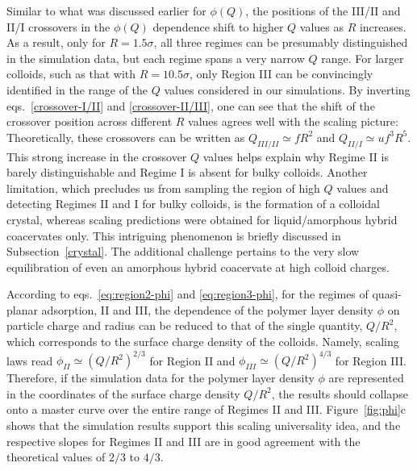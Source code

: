\documentclass[journal=mamobx, manuscript=article]{achemso}
\begin{document}
Similar to what was discussed earlier for $\phi (Q)$, the positions of the III/II and II/I crossovers in the $\phi (Q)$ dependence shift to higher $Q$ values as $R$ increases. As a result, only for $R = 1.5 \sigma$, all three regimes can be presumably distinguished in the simulation data, but each regime spans a very narrow $Q$ range. For larger colloids, such as that with $R = 10.5\sigma$, only Region III can be convincingly identified in the range of the $Q$ values considered in our simulations. By inverting eqs.~\ref{crossover-I/II} and \ref{crossover-II/III}, one can see that the shift of the crossover position across different $R$ values agrees well with the scaling picture: Theoretically, these crossovers can be written as $Q_{III/II} \simeq f R^2$ and 
$Q_{II/I} \simeq u f^3 R^5$. This strong increase in the crossover $Q$ values helps explain why Regime II is barely distinguishable and Regime I is absent for bulky colloids. Another limitation, which precludes us from sampling the region of high $Q$ values and detecting Regimes II and I for bulky colloids, is the formation of a colloidal crystal, whereas scaling predictions were obtained for liquid/amorphous hybrid coacervates only. This intriguing phenomenon is briefly discussed in Subsection~\ref{crystal}. The additional challenge pertains to the very slow equilibration of even an amorphous hybrid coacervate at high colloid charges. 


According to eqs.~\ref{eq:region2-phi} and \ref{eq:region3-phi}, for the regimes of quasi-planar adsorption, II and III, the dependence of the polymer layer density $\phi$ on particle charge and radius can be reduced to that of the single quantity, $Q / R^2$, which corresponds to the surface charge density of the colloids. Namely, scaling laws read 
$\phi_{II} \simeq (Q / R^2 )^{2/3}$ for Region II and $\phi_{III} \simeq (Q / R^2 )^{4/3}$ for Region III. Therefore, if the simulation data for the polymer layer density $\phi$
are represented in the coordinates of the surface charge density $Q /R^{2}$, the results should collapse onto a master curve over the entire range of Regimes II and III. Figure~\ref{fig:phi}c shows that the simulation results support this scaling universality idea, and the respective slopes for Regimes II and III are in good agreement with the theoretical values of $2/3$ to $4/3$. 

\end{document}
